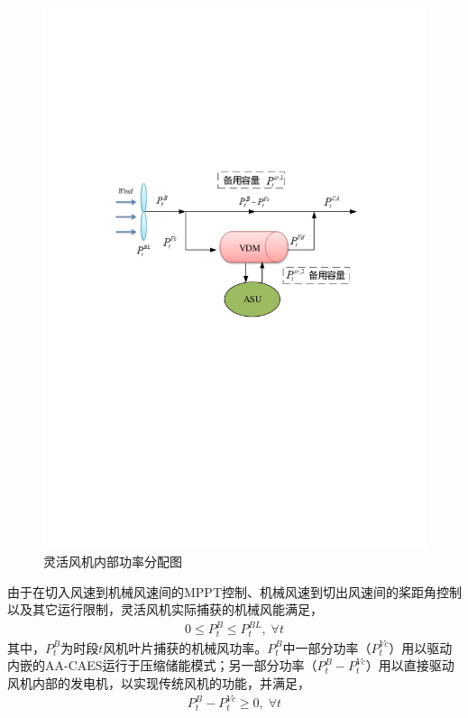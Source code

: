 \begin{figure}[H] %
  \centering
  \includegraphics[scale=0.72]{figures/Chap5-CAWT-Power-Flow-V2.pdf}
  \caption{灵活风机内部功率分配图}
  \label{fig:CAWT-Power-Flow}
\end{figure}

由于在切入风速到机械风速间的MPPT控制、机械风速到切出风速间的桨距角控制以及其它运行限制，灵活风机实际捕获的机械风能满足，
\begin{gather}
\label{eq:CA-WT-Wind-Blade-Limit-1}
0 \le P_t^B \le P_t^{BL},\; \forall t
\end{gather}
其中，$P_t^B$为时段$t$风机叶片捕获的机械风功率。$P_t^B$中一部分功率（$P_t^{Vc}$）用以驱动内嵌的AA-CAES运行于压缩储能模式；另一部分功率（$P_t^B - P_t^{Vc}$）用以直接驱动风机内部的发电机，以实现传统风机的功能，并满足，
\begin{gather}
\label{eq:CA-WT-Wind-Blade-Limit-2}
P_t^B - P_t^{Vc} \ge 0,\;\forall t
\end{gather}

